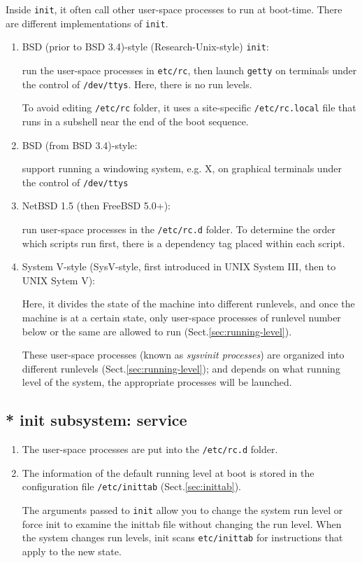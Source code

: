 Inside \verb!init!, it often call other user-space processes to run at
boot-time. There are different implementations of \verb!init!.
\begin{enumerate}
  \item BSD (prior to BSD 3.4)-style (Research-Unix-style) \verb!init!: 
  
run the user-space processes in \verb!etc/rc!, then launch \verb!getty! on terminals under
the control of \verb!/dev/ttys!. Here, there is no run levels.
   
To avoid editing \verb!/etc/rc! folder, it uses a site-specific
\verb!/etc/rc.local! file that runs in a subshell near the end of the boot
sequence.


  \item BSD (from BSD 3.4)-style:
  
 support running a windowing system, e.g. X, on graphical terminals under the
 control of \verb!/dev/ttys!
 
 \item NetBSD 1.5 (then FreeBSD 5.0+): 

run user-space processes in the \verb!/etc/rc.d! folder. To determine the order which scripts
run first, there is a dependency tag placed within each script.
  
  \item System V-style (SysV-style, first introduced in UNIX System III, then to
  UNIX Sytem V):

Here, it divides the state of the machine into different runlevels, and 
once the machine is at a certain state, only user-space processes of runlevel
number below or the same are allowed to run (Sect.\ref{sec:running-level}).
  
   
These user-space processes (known as {\it sysvinit processes}) are organized
into different runlevels (Sect.\ref{sec:running-level}); and 
depends on what running level of the system, the appropriate processes will
be launched. 
  
\end{enumerate}

\subsection{* init subsystem: service}
\label{sec:init-subsystem}

\begin{enumerate}
  \item The user-space processes are put into the \verb!/etc/rc.d! folder.

  \item The information of the default running level at boot is stored  in the
  configuration file \verb!/etc/inittab! (Sect.\ref{sec:inittab}).

The arguments passed to \verb!init! allow you to change the system run level or
force init to examine the inittab file without changing the run level. When the
system changes run levels, init scans \verb!etc/inittab! for instructions that
apply to the new state.

\end{enumerate}


